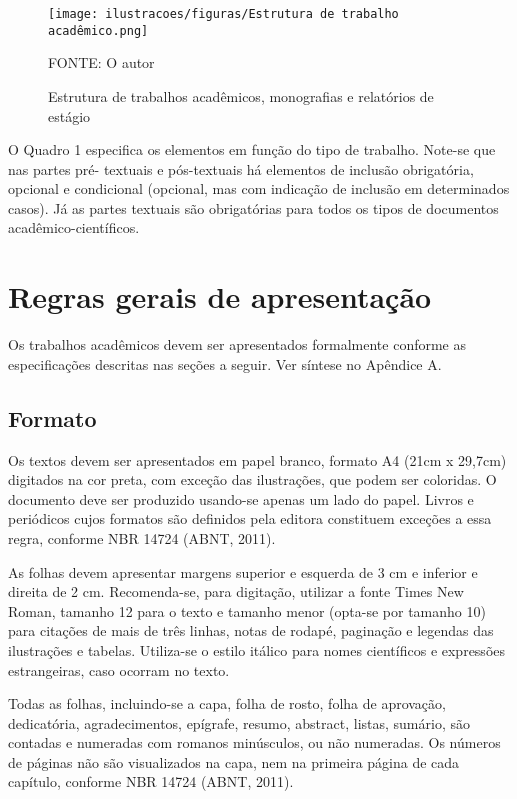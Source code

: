 \documentclass[a4paper,12pt]{article}  %
\begin{document}
\begin{ElementosTextuais}
\begin{Desenvolvimento}
\begin{figure}[h!]
  \centering
  \texttt{[image: ilustracoes/figuras/Estrutura de trabalho acadêmico.png]}
  \caption{Estrutura de trabalhos acadêmicos, monografias e relatórios de estágio}
  \vspace{0em}
  \begin{minipage}{\textwidth}
    FONTE: O autor
  \end{minipage}
  \label{fig:EstruturaTrabalhoAcademico}
\end{figure}


O Quadro 1 especifica os elementos em função do tipo de trabalho. Note-se que nas partes pré- textuais e pós-textuais há elementos de inclusão obrigatória, opcional e condicional (opcional, mas com indicação de inclusão em determinados casos). Já as partes textuais são obrigatórias para todos os tipos de documentos acadêmico-científicos.

\section{Regras gerais de apresentação}
Os trabalhos acadêmicos devem ser apresentados formalmente conforme as especificações descritas nas seções a seguir. Ver síntese no Apêndice A.

\subsection{Formato}
Os textos devem ser apresentados em papel branco, formato A4 (21cm x 29,7cm) digitados na cor preta, com exceção das ilustrações, que podem ser coloridas. O documento deve ser produzido usando-se apenas um lado do papel. Livros e periódicos cujos formatos são definidos pela editora constituem exceções a essa regra, conforme NBR 14724 (ABNT, 2011).

As folhas devem apresentar margens superior e esquerda de 3 cm e inferior e direita de 2 cm. Recomenda-se, para digitação, utilizar a fonte Times New Roman, tamanho 12 para o texto e tamanho menor (opta-se por tamanho 10) para citações de mais de três linhas, notas de rodapé, paginação e legendas das ilustrações e tabelas. Utiliza-se o estilo itálico para nomes científicos e expressões estrangeiras, caso ocorram no texto.

Todas as folhas, incluindo-se a capa, folha de rosto, folha de aprovação, dedicatória, agradecimentos, epígrafe, resumo, abstract, listas, sumário, são contadas e numeradas com romanos minúsculos, ou não numeradas. Os números de páginas não são visualizados na capa, nem na primeira página de cada capítulo, conforme NBR 14724 (ABNT, 2011).


\end{Desenvolvimento}
\end{ElementosTextuais}
\end{document}
